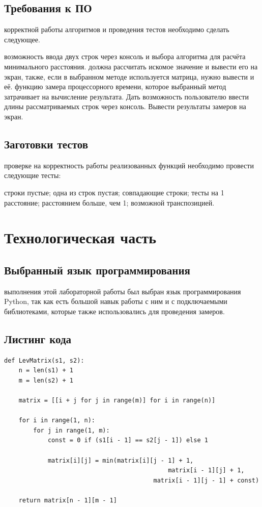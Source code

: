 \documentclass[12pt]{report}
\begin{document}
\section{Требования к ПО}
 корректной работы алгоритмов и проведения тестов необходимо сделать следующее.
\begin{enumerate}
	 возможность ввода двух строк через консоль и выбора алгоритма для расчёта минимального расстояния.
	 должна рассчитать искомое значение и вывести его на экран, также, если в выбранном методе используется матрица, нужно вывести и её.
	 функцию замера процессорного времени, которое выбранный метод затрачивает на вычисление результата. Дать возможность пользователю ввести длины рассматриваемых строк через консоль. Вывести результаты замеров на экран.
	\end{enumerate}

\section{Заготовки тестов}
 проверке на корректность работы реализованных функций необходимо провести следующие тесты:
\begin{enumerate}
	 строки пустые;
	 одна из строк пустая;
	 совпадающие строки;
	 тесты на 1 расстояние;
	 расстоянием больше, чем 1;
	 возможной транспозицией.
\end{enumerate}

\chapter{Технологическая часть}
\section{Выбранный язык программирования}
 выполнения этой лабораторной работы был выбран язык программирования Python, так как есть большой навык работы с ним и с подключаемыми библиотеками, которые также использовались для проведения замеров.
\section{Листинг кода}
\begin{lstlisting}[label=some-code, caption = Матричный алгоритм нахождения расстояния Левенштейна]
def LevMatrix(s1, s2):
	n = len(s1) + 1
	m = len(s2) + 1
	
	matrix = [[i + j for j in range(m)] for i in range(n)]
	
	for i in range(1, n):
		for j in range(1, m):
			const = 0 if (s1[i - 1] == s2[j - 1]) else 1
	
			matrix[i][j] = min(matrix[i][j - 1] + 1,
							   				 matrix[i - 1][j] + 1,
		 	  				   			 matrix[i - 1][j - 1] + const)
	
	return matrix[n - 1][m - 1]
	
	\end{lstlisting}
\end{document}
